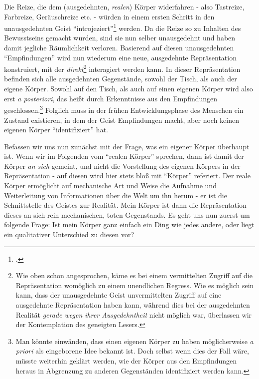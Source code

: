 \documentclass[a4paper, 12pt]{article}
\begin{document}
\begin{onehalfspace}
Die Reize, die dem (ausgedehnten, \emph{realen}) Körper widerfahren - also Tastreize, Farbreize, Geräuschreize etc. - würden in einem ersten Schritt in den unausgedehnten Geist "`introjeziert"'\footnote{\Cite[Vgl.][S. ???]{scheler-ethik}.} werden. Da die Reize so zu Inhalten des Bewusstseins gemacht wurden, sind sie nun selber unausgedehnt und haben damit jegliche Räumlichkeit verloren. Basierend auf diesen unausgedehnten "`Empfindungen"' wird nun wiederum eine neue, ausgedehnte Repräsentation konstruiert, mit der \emph{direkt}\footnote{Wie oben schon angesprochen, käme es bei einem vermittelten Zugriff auf die Repräsentation womöglich zu einem unendlichen Regress. Wie es möglich sein kann, dass der unausgedehnte Geist unvermittelten Zugriff auf eine ausgedehnte Repräsentation haben kann, während dies bei der ausgedehnten Realität \emph{gerade wegen ihrer Ausgedehntheit} nicht möglich war, überlassen wir der Kontemplation des geneigten Lesers.} interagiert werden kann. In dieser Repräsentation befinden sich alle ausgedehnten Gegenstände, sowohl der Tisch, als auch der eigene Körper. Sowohl auf den Tisch, als auch auf einen eigenen Körper wird also erst \emph{a posteriori}, das heißt durch Erkenntnisse aus den Empfindungen geschlossen.\footnote{Man könnte einwänden, dass einen eigenen Körper zu haben möglicherweise \emph{a priori} als eingeborene Idee bekannt ist. Doch selbst wenn dies der Fall wäre, müsste weiterhin geklärt werden, wie der Körper aus den Empfindungen heraus in Abgrenzung zu anderen Gegenständen identifiziert werden kann.} Folglich muss in der frühen Entwicklungsphase des Menschen ein Zustand existieren, in dem der Geist Empfindungen macht, aber noch keinen eigenen Körper "`identifiziert"' hat.  

Befassen wir uns nun zunächst mit der Frage, was ein eigener Körper überhaupt ist. Wenn wir im Folgenden vom "`realen Körper"' sprechen, dann ist damit der Körper \emph{an sich} gemeint, und nicht die Vorstellung des eigenen Körpers in der Repräsentation - auf diesen wird hier stets bloß mit "`Körper"' referiert. Der reale Körper ermöglicht auf mechanische Art und Weise die Aufnahme und Weiterleitung von Informationen über die Welt um ihn herum - er ist die Schnittstelle des Geistes zur Realität. Mein Körper ist dann die Repräsentation dieses an sich rein mechanischen, toten Gegenstands. Es geht uns nun zuerst um folgende Frage: Ist mein Körper ganz einfach ein Ding wie jedes andere, oder liegt ein qualitativer Unterschied zu diesen vor? 


\end{onehalfspace}
\end{document}
